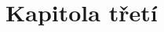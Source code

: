 \documentclass[main.tex]{subfiles}
\begin{document}
\section{Kapitola třetí}
\lipsum[2]
\end{document}
